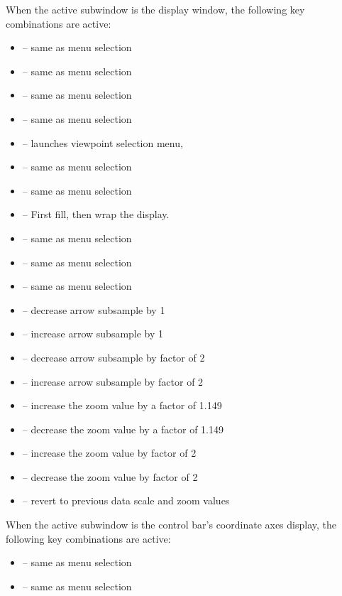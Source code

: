 When the active subwindow is the display window, the following
key combinations are active:
\begin{itemize}
\item {} -- same as menu selection 
\item {} -- same as menu selection 
                       {}
\item {} -- same as menu selection
                       {}
\item {} -- same as menu selection
\item {} -- launches viewpoint selection menu,
\item {} -- same as menu selection {}
\item {} -- same as menu selection {}
\item {} -- First fill, then wrap the display.
\item {} --
 same as menu selection {}
\item {} -- same as menu selection 
\item {} -- same as menu selection 
\item {} -- decrease arrow subsample by 1
\item {} -- increase arrow subsample by 1
\item {} -- decrease arrow subsample by factor of 2
\item {} -- increase arrow subsample by factor of 2
\item {} -- increase the zoom value by a factor of 1.149
\item {} -- decrease the zoom value by a factor of 1.149
\item {} -- increase the zoom value by factor of 2
\item {} -- decrease the zoom value by factor of 2
\item {} -- revert to previous data scale and zoom values
\end{itemize}

When the active subwindow is the control bar's coordinate axes display,
the following key combinations are active:
\begin{itemize}
\item {} -- same as menu selection 
\item {} -- same as menu selection 
\end{itemize}

